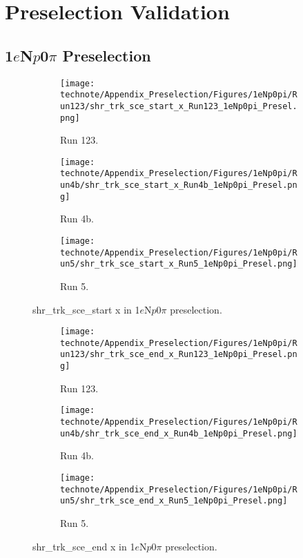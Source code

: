 \section{Preselection Validation}
\label{appendix:PreselectionValidation}

\subsection{1$e$N$p$0$\pi$ Preselection}
\label{appendix:Np0pi_preselection}

\begin{figure}[H]
    \centering
    \begin{subfigure}[t]{0.32\linewidth}
        \texttt{[image: technote/Appendix\_Preselection/Figures/1eNp0pi/Run123/shr\_trk\_sce\_start\_x\_Run123\_1eNp0pi\_Presel.png]}
        \caption{Run 123.}
    \end{subfigure}%
    \hspace{0.2cm}%
    \begin{subfigure}[t]{0.32\linewidth}
        \texttt{[image: technote/Appendix\_Preselection/Figures/1eNp0pi/Run4b/shr\_trk\_sce\_start\_x\_Run4b\_1eNp0pi\_Presel.png]}
        \caption{Run 4b.}
    \end{subfigure}%
    \hspace{0.2cm}%
    \begin{subfigure}[t]{0.32\linewidth}
        \texttt{[image: technote/Appendix\_Preselection/Figures/1eNp0pi/Run5/shr\_trk\_sce\_start\_x\_Run5\_1eNp0pi\_Presel.png]}
        \caption{Run 5.}
    \end{subfigure}
    \caption{shr\_trk\_sce\_start x in 1$e$N$p$0$\pi$ preselection.}
\end{figure}

\begin{figure}[H]
    \centering
    \begin{subfigure}[t]{0.32\linewidth}
        \texttt{[image: technote/Appendix\_Preselection/Figures/1eNp0pi/Run123/shr\_trk\_sce\_end\_x\_Run123\_1eNp0pi\_Presel.png]}
        \caption{Run 123.}
    \end{subfigure}%
    \hspace{0.2cm}%
    \begin{subfigure}[t]{0.32\linewidth}
        \texttt{[image: technote/Appendix\_Preselection/Figures/1eNp0pi/Run4b/shr\_trk\_sce\_end\_x\_Run4b\_1eNp0pi\_Presel.png]}
        \caption{Run 4b.}
    \end{subfigure}%
    \hspace{0.2cm}%
    \begin{subfigure}[t]{0.32\linewidth}
        \texttt{[image: technote/Appendix\_Preselection/Figures/1eNp0pi/Run5/shr\_trk\_sce\_end\_x\_Run5\_1eNp0pi\_Presel.png]}
        \caption{Run 5.}
    \end{subfigure}
    \caption{shr\_trk\_sce\_end x in 1$e$N$p$0$\pi$ preselection.}
\end{figure}

